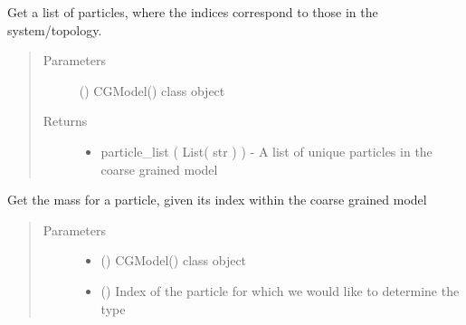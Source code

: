 \documentclass[letterpaper,12pt,english,openany,oneside]{sphinxmanual}
\begin{document}
\begin{fulllineitems}
\begin{fulllineitems}
\end{fulllineitems}


\begin{fulllineitems}
\label{\detokenize{cg_model:cg_model.cgmodel.CGModel.get_particle_list}}
Get a list of particles, where the indices correspond to those in the system/topology.
\begin{quote}\begin{description}
\item[{Parameters}] \leavevmode
{} () \textendash{} CGModel() class object

\item[{Returns}] \leavevmode
\begin{itemize}
\item {} 
particle\_list ( List( str ) ) - A list of unique particles in the coarse grained model

\end{itemize}


\end{description}\end{quote}

\end{fulllineitems}


\begin{fulllineitems}
\label{\detokenize{cg_model:cg_model.cgmodel.CGModel.get_particle_mass}}
Get the mass for a particle, given its index within the coarse grained model
\begin{quote}\begin{description}
\item[{Parameters}] \leavevmode\begin{itemize}
\item {} 
 () \textendash{} CGModel() class object

\item {} 
 () \textendash{} Index of the particle for which we would like to determine the type


\end{itemize}
\end{description}
\end{quote}
\end{fulllineitems}
\end{fulllineitems}
\end{document}
